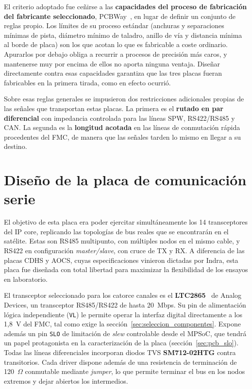 El criterio adoptado fue ceñirse a las \textbf{capacidades del proceso de fabricación del fabricante
seleccionado}, PCBWay~\cite{pcbway_caps}, en lugar de definir un conjunto de reglas propio. Los
límites de su proceso estándar (anchuras y separaciones mínimas de pista, diámetro mínimo de
taladro, anillo de vía y distancia mínima al borde de placa) son los que acotan lo que es
fabricable a coste ordinario. Apurarlos por debajo obliga a recurrir a procesos de precisión más
caros, y mantenerse muy por encima de ellos no aporta ninguna ventaja. Diseñar directamente contra esas
capacidades garantiza que las tres placas fueran fabricables en la primera tirada, como en efecto
ocurrió.

Sobre esas reglas generales se impusieron dos restricciones adicionales propias de las señales que
transportan estas placas. La primera es el \textbf{rutado en par diferencial} con impedancia
controlada para las líneas SPW, RS422/RS485 y CAN. La segunda es la
\textbf{longitud acotada} en las líneas de conmutación rápida procedentes del FMC, de manera que 
las señales tarden lo mismo en llegar a su destino.

\section{Diseño de la placa de comunicación serie} \label{sec:diseno_pcb_serie}

El objetivo de esta placa era poder ejercitar simultáneamente los 14 transceptores del IP core,
replicando las topologías de bus reales que se encontrarán en el satélite. Estas son RS485
multipunto, con múltiples nodos en el mismo cable, y RS422 en configuración \textit{master/slave},
con cruce de TX y RX. A diferencia de las placas CDHS y AOCS, cuyas especificaciones vinieron dictadas
por Indra, esta placa fue diseñada con total libertad para maximizar la flexibilidad de los
ensayos en laboratorio.

El transceptor seleccionado para los catorce canales es el \textbf{LTC2865}~\cite{ltc2865} de
Analog Devices, un transceptor RS485/RS422 de hasta 20~Mbps. Su pin de alimentación lógica
independiente (\texttt{VL}) le permite operar la interfaz digital directamente a los 1,8~V del
FMC, tal como exige la sección~\ref{sec:seleccion_componentes}. Expone además un
pin \texttt{SLO} de limitación de \textit{slew} controlable desde el MPSoC, que tendrá un papel
protagonista en la caracterización de la placa (sección~\ref{sec:pcb_slo}). Todas las líneas
diferenciales incorporan diodos TVS \textbf{SM712-02HTG} contra transitorios. Cada driver
dispone además de una resistencia de terminación de 120~$\Omega$ conmutable mediante
\textit{jumper}, lo que permite terminar el bus en los nodos extremos y dejar abiertos los
intermedios.

